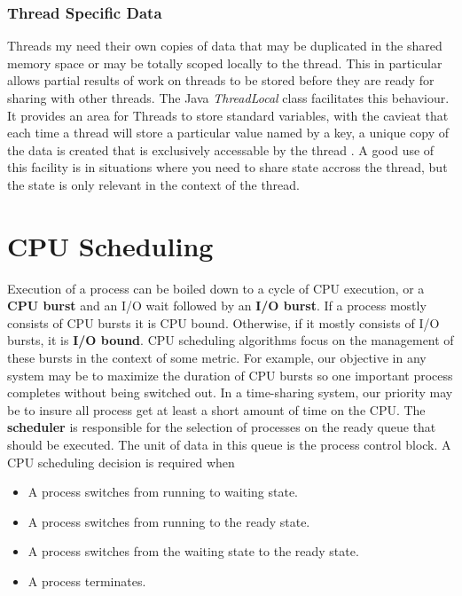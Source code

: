 \documentclass[10pt,a4paper]{article}
\begin{document}
\subsubsection{Thread Specific Data}
Threads my need their own copies of data that may be duplicated in the shared memory space or may be totally scoped locally to the thread. This in particular allows partial results of work on threads to be stored before they are ready for sharing with other threads. The Java {\it ThreadLocal } class facilitates this behaviour. It provides an area for Threads to store standard variables, with the cavieat that each time a thread will store a particular value named by a key, a unique copy of the data is created that is exclusively accessable by the thread \cite{threadlocal}. A good use of this facility is in situations where you need to share state accross the thread, but the state is only relevant in the context of the thread.  
\section{CPU Scheduling}
Execution of a process can be boiled down to a cycle of CPU execution, or a {\bf CPU burst} and an I/O wait followed by an {\bf I/O burst}. If a process mostly consists of CPU bursts it is CPU bound. Otherwise, if it mostly consists of I/O bursts, it is {\bf I/O bound}. CPU scheduling algorithms focus on the management of these bursts in the context of some metric. For example, our objective in any system may be to maximize the duration of CPU bursts so one important process completes without being switched out. In a time-sharing system, our priority may be to insure all process get at least a short amount of time on the CPU. The {\bf scheduler} is responsible for the selection of processes on the ready queue that should be executed. The unit of data in this queue is the process control block. 
\newline\newline
A CPU scheduling decision is required when 
\begin{itemize}
\item A process switches from running to waiting state. 
\item A process switches from running to the ready state. 
\item A process switches from the waiting state to the ready state. 
\item A process terminates. 
\end{itemize}
\end{document}
